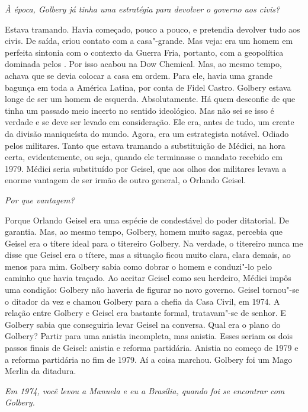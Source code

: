 \itshape
 À época, Golbery já tinha uma estratégia para devolver
o governo aos civis?

\normalfont 
Estava tramando. Havia começado, pouco a pouco, e
pretendia devolver tudo aos civis. De saída, criou contato com a
casa"-grande. Mas veja: era um homem em perfeita sintonia com o contexto
da Guerra Fria, portanto, com a geopolítica dominada pelos . Por isso
acabou na Dow Chemical. Mas, ao mesmo tempo, achava que se devia colocar
a casa em ordem. Para ele, havia uma grande bagunça em toda a América
Latina, por conta de Fidel Castro. Golbery estava longe de ser um homem
de esquerda. Absolutamente. Há quem desconfie de que tinha um passado
meio incerto no sentido ideológico. Mas não sei se isso é verdade e se
deve ser levado em consideração. Ele era, antes de tudo, um crente da
divisão maniqueísta do mundo. Agora, era um estrategista notável. Odiado
pelos militares. Tanto que estava tramando a substituição de Médici, na
hora certa, evidentemente, ou seja, quando ele terminasse o mandato
recebido em 1979. Médici seria substituído por Geisel, que aos olhos dos
militares levava a enorme vantagem de ser irmão de outro general, o
Orlando Geisel.

\itshape
 Por que vantagem?

\normalfont 
Porque Orlando Geisel era uma espécie de condestável do
poder ditatorial. De garantia. Mas, ao mesmo tempo, Golbery, homem muito
sagaz, percebia que Geisel era o títere ideal para o titereiro Golbery.
Na verdade, o titereiro nunca me disse que Geisel era o títere, mas a
situação ficou muito clara, clara demais, ao menos para mim. Golbery
sabia como dobrar o homem e conduzi"-lo pelo caminho que havia traçado.
Ao aceitar Geisel como seu herdeiro, Médici impôs uma condição: Golbery
não haveria de figurar no novo governo. Geisel tornou"-se o ditador da
vez e chamou Golbery para a chefia da Casa Civil, em 1974. A relação
entre Golbery e Geisel era bastante formal, tratavam"-se de senhor. E
Golbery sabia que conseguiria levar Geisel na conversa. Qual era o plano
do Golbery? Partir para uma anistia incompleta, mas anistia. Esses
seriam os dois passos finais de Geisel: anistia e reforma partidária.
Anistia no começo de 1979 e a reforma partidária no fim de 1979. Aí a
coisa marchou. Golbery foi um Mago Merlin da ditadura.

\itshape
 Em 1974, você levou a Manuela e eu a Brasília, quando
foi se encontrar com Golbery.

